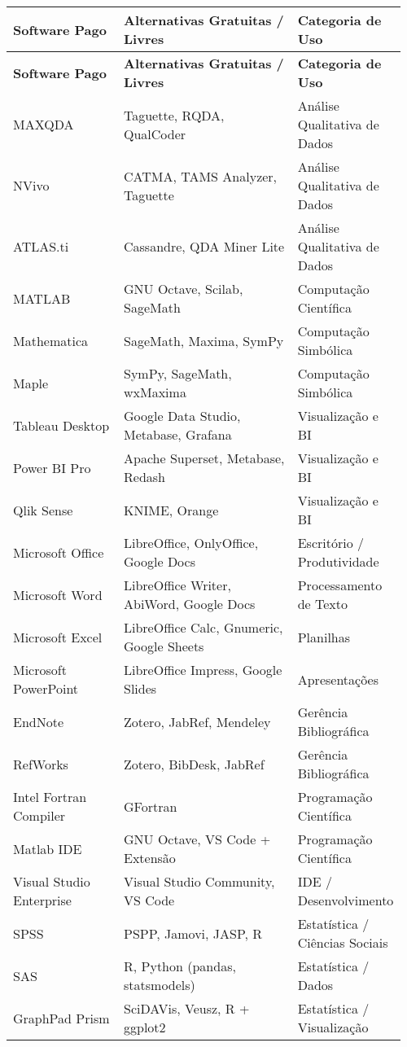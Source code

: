 {\small
\begin{longtable}{
  >{\raggedright\arraybackslash}p{0.28\linewidth}
  >{\raggedright\arraybackslash}p{0.44\linewidth}
  >{\raggedright\arraybackslash}p{0.24\linewidth}
}
\toprule
\textbf{Software Pago} & \textbf{Alternativas Gratuitas / Livres} & \textbf{Categoria de Uso} \\
\midrule
\endfirsthead

\toprule
\textbf{Software Pago} & \textbf{Alternativas Gratuitas / Livres} & \textbf{Categoria de Uso} \\
\midrule
\endhead

MAXQDA & Taguette, RQDA, QualCoder & Análise Qualitativa de Dados \\
NVivo & CATMA, TAMS Analyzer, Taguette & Análise Qualitativa de Dados \\
ATLAS.ti & Cassandre, QDA Miner Lite & Análise Qualitativa de Dados \\

MATLAB & GNU Octave, Scilab, SageMath & Computação Científica \\
Mathematica & SageMath, Maxima, SymPy & Computação Simbólica \\
Maple & SymPy, SageMath, wxMaxima & Computação Simbólica \\

Tableau Desktop & Google Data Studio, Metabase, Grafana & Visualização e BI \\
Power BI Pro & Apache Superset, Metabase, Redash & Visualização e BI \\
Qlik Sense & KNIME, Orange & Visualização e BI \\

Microsoft Office & LibreOffice, OnlyOffice, Google Docs & Escritório / Produtividade \\
Microsoft Word & LibreOffice Writer, AbiWord, Google Docs & Processamento de Texto \\
Microsoft Excel & LibreOffice Calc, Gnumeric, Google Sheets & Planilhas \\
Microsoft PowerPoint & LibreOffice Impress, Google Slides & Apresentações \\

EndNote & Zotero, JabRef, Mendeley & Gerência Bibliográfica \\
RefWorks & Zotero, BibDesk, JabRef & Gerência Bibliográfica \\

Intel Fortran Compiler & GFortran & Programação Científica \\
Matlab IDE & GNU Octave, VS Code + Extensão & Programação Científica \\
Visual Studio Enterprise & Visual Studio Community, VS Code & IDE / Desenvolvimento \\

SPSS & PSPP, Jamovi, JASP, R & Estatística / Ciências Sociais \\
SAS & R, Python (pandas, statsmodels) & Estatística / Dados \\
GraphPad Prism & SciDAVis, Veusz, R + ggplot2 & Estatística / Visualização \\

\bottomrule
\end{longtable}
}

